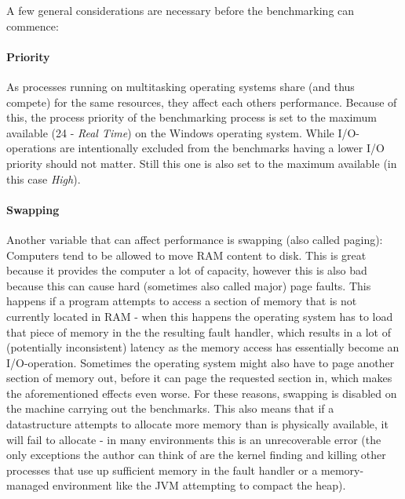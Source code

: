 A few general considerations are necessary before the benchmarking can commence:

\paragraph{Priority} As processes running on multitasking operating systems share (and thus compete) for the same resources, they affect each others performance. Because of this, the process priority of the benchmarking process is set to the maximum available (24 - \textit{Real Time}) on the Windows operating system. While \acs{I/O}-operations are intentionally excluded from the benchmarks having a lower \acs{I/O} priority should not matter. Still this one is also set to the maximum available (in this case \textit{High}).

\paragraph{Swapping} Another variable that can affect performance is swapping (also called paging): Computers tend to be allowed to move \acs{RAM} content to disk. This is great because it provides the computer a lot of capacity, however this is also bad because this can cause hard (sometimes also called major) page faults. This happens if a program attempts to access a section of memory that is not currently located in \acs{RAM} - when this happens the operating system has to load that piece of memory in the the resulting fault handler, which results in a lot of (potentially inconsistent) latency as the memory access has essentially become an \acs{I/O}-operation. Sometimes the operating system might also have to page another section of memory out, before it can page the requested section in, which makes the aforementioned effects even worse. For these reasons, swapping is disabled on the machine carrying out the benchmarks. This also means that if a datastructure attempts to allocate more memory than is physically available, it will fail to allocate - in many environments this is an unrecoverable error (the only exceptions the author can think of are the kernel finding and killing other processes that use up sufficient memory in the fault handler or a memory-managed environment like the \acs{JVM} attempting to compact the heap).